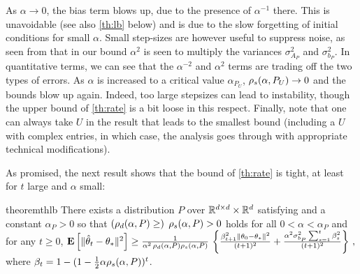 As $\alpha\to 0$, the bias term blows up, due to the presence of $\alpha^{-1}$ there. This is unavoidable (see also \cref{th:lb} below) and is due to the slow forgetting of initial conditions for small $\alpha$. Small step-sizes are however useful to suppress noise, as seen from that in our bound $\alpha^2$ is seen to multiply the variances $\sigma^2_{A_P}$ and $\sigma^2_{b_P}$. In quantitative terms, we can see that the $\alpha^{-2}$ and $\alpha^2$ terms are trading off the two types of errors. As $\alpha$ is increased to a critical value $\alpha_{P_U}$, 
$\rho_s(\alpha,P_U)\rightarrow 0$ and the bounds blow up again. Indeed, too large stepsizes can lead to instability, though the upper bound of \cref{th:rate} is a bit loose in this respect.
Finally, note that one can always take $U$ in the result that leads to the smallest bound (including a $U$ with complex entries, in which case, the analysis goes through with appropriate technical modifications). 
\begin{comment}
\textbf{Proof Sketch:} We can expand the MSE as $\EE{\norm{\eh_t}^2}=\tfrac{1}{(t+1)^2}\, \ip{ \textstyle\sum_{s=0}^t e_s,\textstyle\sum_{s=0}^t e_s}\,,$
where $\eh_t = \thh_t-\ts$ and $e_t = \theta_t-\ts$, and the inner product is a summation of \emph{diagonal} terms $\EE{\ip{e_s,e_s}}$ and \emph{cross} terms of $\EE{\ip{e_s,e_q}}$, $s\neq q$. Since, we also use a basis transformation via $U$, the growth of the diagonal terms and the cross terms depends on the spectral norm of the random matrices $I-\alpha \Lambda_t$ and that of the deterministic matrix $I-\alpha \Lambda$, respectively. This explains the reason as to why $\rhos{P_U}$ and $\rhod{P_U} $ appear in the bounds.
\end{comment}
As promised, the next result shows that the bound of \cref{th:rate} is tight, at least for $t$ large and $\alpha$ small:
\begin{restatable}{theorem}{thlb}
\label{th:lb}
There exists a distribution $P$ over $ \mathbb{R}^{d \times d}\times\mathbb{R}^d$ satisfying  and a constant
 $\alpha_P>0$ so that $(\rho_d(\alpha,P)\ge )$ $\rho_s(\alpha,P)>0$  holds for all
$0<\alpha<\alpha_P$ and
for any $t\ge 0$,  $\mathbf{E}\left[\| \hat{\theta}_t-\theta_*\|^2\right] 
\geq \frac{1}{\alpha^2 \, \rho_d(\alpha,P)\rho_s(\alpha,P)} \,\left\{ \frac{\beta_{t+1}^2 \left\| \theta_0-\theta_*\right\|^2}{(t+1)^2} 
+ \frac{\alpha^2 \sigma^2_{b_P}\sum_{s=1}^t \beta_{s}^2  }{(t+1)^2} \right\}\,,$
where $\beta_{t} =  1-(1-\tfrac12 \alpha \rho_s(\alpha,P))^t$.
\end{restatable}
